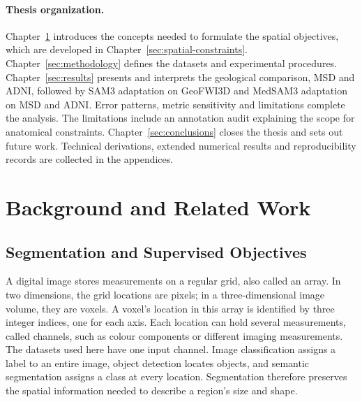 \documentclass[12pt,a4paper]{article}
\begin{document}
\paragraph{Thesis organization.}\label{sec:organization}
Chapter~\ref{sec:background} introduces the concepts needed to formulate
the spatial objectives, which are developed in
Chapter~\ref{sec:spatial-constraints}. Chapter~\ref{sec:methodology}
defines the datasets and experimental procedures.
Chapter~\ref{sec:results} presents and interprets the geological comparison,
MSD and ADNI, followed by SAM3 adaptation on GeoFWI3D and MedSAM3
adaptation on MSD and ADNI. Error patterns, metric
sensitivity and limitations complete the analysis. The limitations include
an annotation audit explaining the scope for anatomical constraints.
Chapter~\ref{sec:conclusions} closes the thesis and sets out future work. Technical derivations, extended numerical results
and reproducibility records are collected in the appendices.

\clearpage
\section{Background and Related Work}\label{sec:background}

\subsection{Segmentation and Supervised Objectives}
\label{sec:volumetric-segmentation}\label{sec:segmentation-objectives}

A digital image stores measurements on a regular grid, also called an array.
In two dimensions, the grid locations are pixels; in a three-dimensional
image volume, they are voxels. A voxel's location in this array is
identified by three integer indices, one for each axis. Each location can
hold several measurements, called channels, such as colour components or
different imaging measurements. The datasets used here have one input
channel. Image classification assigns a label to an entire image, object
detection locates objects, and semantic segmentation assigns a class at
every location. Segmentation therefore preserves the spatial information
needed to describe a region's size and shape.
\end{document}
